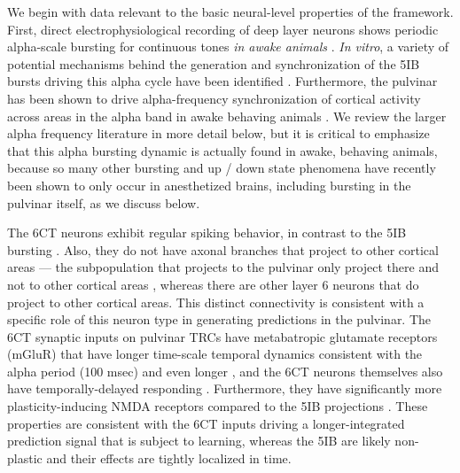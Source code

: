 \documentclass[11pt,twoside]{article}
\newif\myifpdf
\begin{document}
We begin with data relevant to the basic neural-level properties of the framework.  First, direct electrophysiological recording of deep layer neurons shows periodic alpha-scale bursting for continuous tones {\em in awake animals} \citep{LuczakBarthoHarris09,LuczakBarthoHarris13,SakataHarris09,SakataHarris12}.  {\em In vitro}, a variety of potential mechanisms behind the generation and synchronization of the 5IB bursts driving this alpha cycle have been identified \citep{ConnorsGutnickPrince82,SilvaAmitaiConnors91,FranceschettiGuatteoPanzicaEtAl95}.  Furthermore, the pulvinar has been shown to drive alpha-frequency synchronization of cortical activity across areas in the alpha band in awake behaving animals \citep{SaalmannPinskWangEtAl12}.  We review the larger alpha frequency literature in more detail below, but it is critical to emphasize that this alpha bursting dynamic is actually found in awake, behaving animals, because so many other bursting and up / down state phenomena have recently been shown to only occur in anesthetized brains, including bursting in the pulvinar itself, as we discuss below.

The 6CT neurons exhibit regular spiking behavior, in contrast to the 5IB bursting \citep{Thomson10,ThomsonLamy07}. Also, they do not have axonal branches that project to other cortical areas --- the subpopulation that projects to the pulvinar only project there and not to other cortical areas \citep{PetrofViaeneSherman12}, whereas there are other layer 6 neurons that do project to other cortical areas.  This distinct connectivity is consistent with a specific role of this neuron type in generating predictions in the pulvinar.   The 6CT synaptic inputs on pulvinar TRCs have metabatropic glutamate receptors (mGluR) that have longer time-scale temporal dynamics consistent with the alpha period (100 msec) and even longer \citep{Sherman14}, and the 6CT neurons themselves also have temporally-delayed responding \citep{HarrisShepherd15,SakataHarris09,Thomson10}.  Furthermore, they have significantly more plasticity-inducing NMDA receptors compared to the 5IB projections \citep{UsreySherman18}.  These properties are consistent with the 6CT inputs driving a longer-integrated prediction signal that is subject to learning, whereas the 5IB are likely non-plastic and their effects are tightly localized in time.
\end{document}
